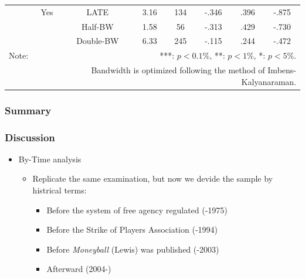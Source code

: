 \documentclass[dvipdfmx,12pt]{beamer}
\begin{document}
\begin{frame}
\begin{table}[!]
\begin{tabular}{lccccccc}
      & Yes & LATE & 3.16 & 134 & -.346 & .396 & -.875 \\
      & & Half-BW & 1.58 & 56 & -.313 & .429 & -.730 \\
      & & Double-BW & 6.33 & 245 & -.115 & .244 & -.472 \\ \hline

      Note: & \multicolumn{7}{r}{***: $p<0.1\%$, **: $p<1\%$, *: $p<5\%$.} \\
      & \multicolumn{7}{r}{Bandwidth is optimized following the method of Imbens-Kalyanaraman.}
    \end{tabular}
  \end{table}
\end{frame}

\begin{frame}\frametitle{}

\end{frame}

\begin{frame}\frametitle{Summary}

\end{frame}

\begin{frame}\frametitle{Discussion}
  \begin{itemize}
    \item By-Time analysis
    \begin{itemize}
      \item Replicate the same examination, but now we devide the sample by histrical terms:
      \begin{itemize}
        \item Before the system of free agency regulated (-1975)

        \item Before the Strike of Players Association (-1994)

        \item Before \textit{Moneyball} (Lewis) was published (-2003)

        \item Afterward (2004-)
      \end{itemize}
    \end{itemize}
  \end{itemize}

\end{frame}
\end{document}

